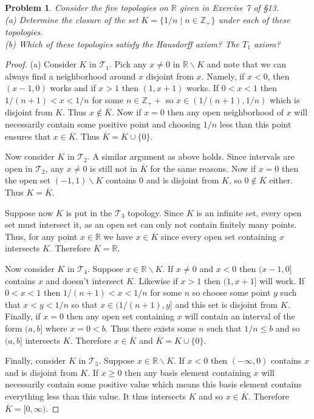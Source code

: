 \documentclass{article}
\newtheorem{problem}{Problem}
\begin{document}
\begin{problem}
Consider the five topologies on $\mathbb{R}$ given in Exercise 7 of \S 13.\\
(a) Determine the closure of the set $K = \{1/n \mid n \in \mathbb{Z}_+\}$ under each of these topologies.\\
(b) Which of these topologies satisfy the Hausdorff axiom? The $T_1$ axiom?
\end{problem}
\begin{proof}
(a) Consider $K$ in $\mathcal{T}_1$. Pick any $x \neq 0$ in $\mathbb{R} \backslash K$ and note that we can always find a neighborhood around $x$ disjoint from $x$. Namely, if $x < 0$, then $(x-1,0)$ works and if $x > 1$ then $(1,x+1)$ works. If $0 < x < 1$ then $1/(n+1) < x < 1/n$ for some $n \in \mathbb{Z}_++$ so $x \in (1/(n+1), 1/n)$ which is disjoint from $K$. Thus $x \notin \overline{K}$. Now if $x = 0$ then any open neighborhood of $x$ will necessarily contain some positive point and choosing $1/n$ less than this point ensures that $x \in \overline{K}$. Thus $\overline{K} = K \cup \{0\}$.

Now consider $K$ in $\mathcal{T}_2$. A similar argument as above holds. Since intervals are open in $\mathcal{T}_2$, any $x \neq 0$ is still not in $\overline{K}$ for the same reasons. Now if $x = 0$ then the open set $(-1,1) \backslash K$ contains $0$ and is disjoint from $K$, so $0 \notin \overline{K}$ either. Thus $K = \overline{K}$.

Suppose now $K$ is put in the $\mathcal{T}_3$ topology. Since $K$ is an infinite set, every open set must intersect it, as an open set can only not contain finitely many points. Thus, for any point $x \in \mathbb{R}$ we have $x \in \overline{K}$ since every open set containing $x$ intersects $K$. Therefore $\overline{K} = \mathbb{R}$.

Now consider $K$ in $\mathcal{T}_4$. Suppose $x \in \mathbb{R} \backslash K$. If $x \neq 0$ and $x < 0$ then $(x-1,0]$ contains $x$ and doesn't intersect $K$. Likewise if $x > 1$ then $(1,x+1]$ will work. If $0 < x < 1$ then $1/(n+1) < x < 1/n$ for some $n$ so choose some point $y$ such that $x < y < 1/n$ so that $x \in (1/(n+1), y]$ and this set is disjoint from $K$. Finally, if $x = 0$ then any open set containing $x$ will contain an interval of the form $(a,b]$ where $x = 0 < b$. Thus there exists some $n$ such that $1/n \leq b$ and so $(a,b]$ intersects $K$. Therefore $x \in \overline{K}$ and $\overline{K} = K \cup \{0\}$.

Finally, consider $K$ in $\mathcal{T}_5$. Suppose $x \in \mathbb{R} \backslash K$. If $x < 0$ then $(-\infty, 0)$ contains $x$ and is disjoint from $K$. If $x \geq 0$ then any basis element containing $x$ will necessarily contain some positive value which means this basis element contains everything less than this value. It thus intersects $K$ and so $x \in \overline{K}$. Therefore $\overline{K} = [0,\infty)$.


\end{proof}
\end{document}
